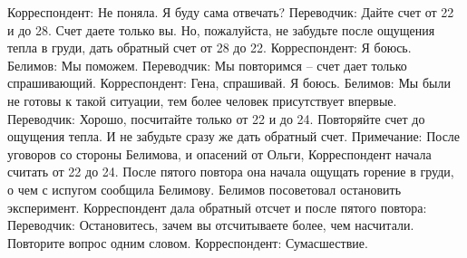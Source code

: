 Корреспондент: Не поняла. Я буду сама отвечать?
Переводчик: Дайте счет от 22 и до 28. Счет даете только вы. Но, пожалуйста, не забудьте после ощущения тепла в груди, дать обратный счет от 28 до 22.
Корреспондент: Я боюсь.
Белимов: Мы поможем.
Переводчик: Мы повторимся – счет дает только спрашивающий.
Корреспондент: Гена, спрашивай. Я боюсь.
Белимов: Мы были не готовы к такой ситуации, тем более человек присутствует впервые.
Переводчик: Хорошо, посчитайте только от 22 и до 24. Повторяйте счет до ощущения тепла. И не забудьте сразу же дать обратный счет.
Примечание: После уговоров со стороны Белимова, и опасений от Ольги, Корреспондент начала считать от 22 до 24. После пятого повтора она начала ощущать горение в груди, о чем с испугом сообщила Белимову. Белимов посоветовал остановить эксперимент. Корреспондент дала обратный отсчет и после пятого повтора:
Переводчик: Остановитесь, зачем вы отсчитываете более, чем насчитали. Повторите вопрос одним словом.
Корреспондент: Сумасшествие.

